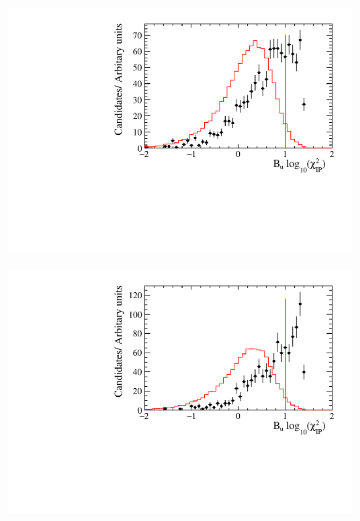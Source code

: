 \begin{figure}[!h]
   \centering
   \begin{subfigure}[t]{0.32\textwidth}
      \centering
      \includegraphics[width=1.0\textwidth]{figs/Selection/Data_MC_Comparison_Var_1_B2DsPhi_Ds2KKPi.pdf}
      \caption{\decay{\Dsp}{\Kp\Km\pip}}
   \end{subfigure}
   \begin{subfigure}[t]{0.32\textwidth}
      \centering
      \includegraphics[width=1.0\textwidth]{figs/Selection/Data_MC_Comparison_Var_1_B2DsPhi_Ds2PiPiPi.pdf}
      \caption{\decay{\Dsp}{\pip\pim\pip}}
   \end{subfigure}
   \begin{subfigure}[t]{0.32\textwidth}
      \centering

\end{subfigure}
\end{figure}
